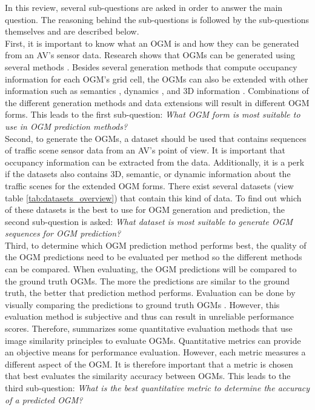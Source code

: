 In this review, several sub-questions are asked in order to answer the main question. The reasoning behind the sub-questions is followed by the sub-questions themselves and are described below. \\ 

First, it is important to know what an \gls{OGM} is and how they can be generated from an \gls{AV}'s sensor data. Research shows that \glspl{OGM} can be generated using several methods \cite{collins2007occupancy} \cite{ribo2001comparison} \cite{thrun2003learning}. Besides several generation methods that compute occupancy information for each \gls{OGM}'s grid cell, the \glspl{OGM} can also be extended with other information such as semantics \cite{lu2019monocular}, dynamics \cite{nuss2018random}, and 3D information \cite{degerman20163d}. Combinations of the different generation methods and data extensions will result in different \gls{OGM} forms. This leads to the first sub-question: \textit{What \gls{OGM} form is most suitable to use in \gls{OGM} prediction methods?} \\

Second, to generate the \glspl{OGM}, a dataset should be used that contains sequences of traffic scene sensor data from an \gls{AV}'s point of view. It is important that occupancy information can be extracted from the data. Additionally, it is a perk if the datasets also contains 3D, semantic, or dynamic information about the traffic scenes for the extended \gls{OGM} forms. There exist several datasets (view table \ref{tab:datasets_overview}) that contain this kind of data. To find out which of these datasets is the best to use for \gls{OGM} generation and prediction, the second sub-question is asked: \textit{What dataset is most suitable to generate OGM sequences for OGM prediction?} \\

Third, to determine which \gls{OGM} prediction method performs best, the quality of the \gls{OGM} predictions need to be evaluated per method so the different methods can be compared. When evaluating, the \gls{OGM} predictions will be compared to the ground truth \glspl{OGM}. The more the predictions are similar to the ground truth, the better that prediction method performs. Evaluation can be done by visually comparing the predictions to ground truth \glspl{OGM} \cite{ribo2001comparison}. However, this evaluation method is subjective and thus can result in unreliable performance scores. Therefore, \cite{collins2007occupancy} summarizes some quantitative evaluation methods that use image similarity principles to evaluate \glspl{OGM}. Quantitative metrics can provide an objective means for performance evaluation. However, each metric measures a different aspect of the \gls{OGM}. It is therefore important that a metric is chosen that best evaluates the similarity accuracy between \glspl{OGM}. This leads to the third sub-question: \textit{What is the best quantitative metric to determine the accuracy of a predicted OGM?} \\

